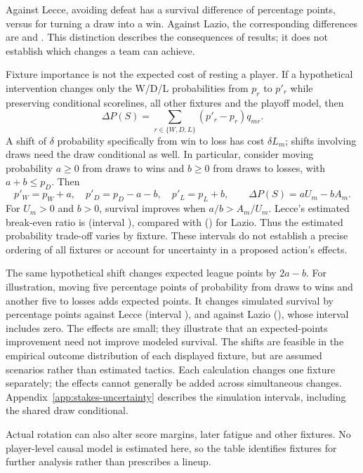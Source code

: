 \documentclass[11pt]{article}
\begin{document}
Against Lecce, avoiding defeat has a survival difference of
\LecceDrawBenefit{} percentage points, versus \LecceWinBenefit{} for turning
a draw into a win. Against Lazio, the corresponding differences are
\LazioDrawBenefit{} and \LazioWinBenefit{}. This distinction describes the
consequences of results; it does not establish which changes a team can achieve.

Fixture importance is not the expected cost of resting a player. If a
hypothetical intervention changes only the W/D/L probabilities from $p_r$ to
$p'_r$ while preserving conditional scorelines, all other fixtures and the
playoff model, then
\[
 \Delta P(S)=\sum_{r\in\{W,D,L\}}(p'_r-p_r)q_{mr}.
\]
A shift of $\delta$ probability specifically from win to loss has cost
$\delta L_m$; shifts involving draws need the draw conditional as well.
In particular, consider moving probability $a\geq0$ from draws to wins and
$b\geq0$ from draws to losses, with $a+b\leq p_D$. Then
\[
 p'_W=p_W+a,\quad p'_D=p_D-a-b,\quad p'_L=p_L+b,
 \qquad \Delta P(S)=aU_m-bA_m.
\]
For $U_m>0$ and $b>0$, survival improves when $a/b>A_m/U_m$.
Lecce's estimated break-even ratio is \LecceBreakEven{}
(interval \LecceBreakEvenCI{}), compared with \LazioBreakEven{}
(\LazioBreakEvenCI{}) for Lazio. Thus the estimated probability trade-off
varies by fixture. These intervals do not establish a precise ordering of
all fixtures or account for uncertainty in a proposed action's effects.

The same hypothetical shift changes expected league points by $2a-b$.
For illustration, moving five percentage points of probability from draws to
wins and another five to losses adds \ScenarioPointsGain{} expected points.
It changes simulated survival by \LecceScenarioChange{} percentage points
against Lecce (interval \LecceScenarioCI{}), and \LazioScenarioChange{}
against Lazio (\LazioScenarioCI{}), whose interval includes zero.
The effects are small; they illustrate
that an expected-points improvement need not improve modeled survival.
The shifts are feasible in the empirical outcome distribution of each
displayed fixture, but are assumed scenarios rather than estimated tactics.
Each calculation changes one fixture separately; the effects cannot generally
be added across simultaneous changes. Appendix~\ref{app:stakes-uncertainty}
describes the simulation intervals, including the shared draw conditional.

Actual rotation can also alter score margins, later fatigue and other fixtures.
No player-level causal model is estimated here, so the table identifies
fixtures for further analysis rather than prescribes a lineup.
\end{document}
